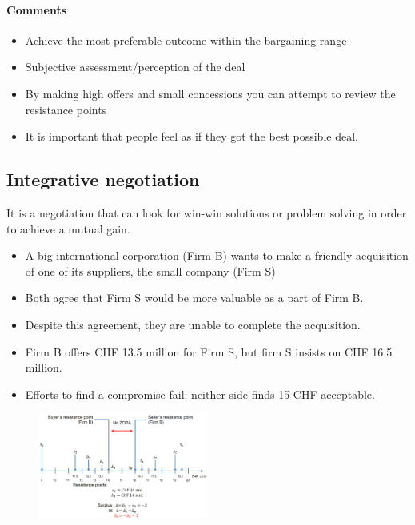 \paragraph{Comments}
\begin{itemize}
    \item Achieve the most preferable outcome within the bargaining range
    \item Subjective assessment/perception of the deal
    \item By making high offers and small concessions you can attempt to review the
        resistance points
    \item It is important that people feel as if they got the best possible deal.
\end{itemize}

\subsection{Integrative negotiation}

It is a negotiation that can look for win-win solutions or problem solving
in order to achieve a mutual gain.

\begin{example}
    \begin{itemize}
        \item A big international corporation (Firm B) wants to make a friendly
            acquisition of one of its suppliers, the small company (Firm S)
        \item Both agree that Firm S would be more valuable as a part of Firm B.
        \item Despite this agreement, they are unable to complete the acquisition.
        \item Firm B offers CHF 13.5 million for Firm S, but firm S insists on CHF
            16.5 million.
        \item Efforts to find a compromise fail: neither side finds 15 CHF acceptable.
    \end{itemize}
\end{example}

\begin{figure}[h]
    \centering
    \includegraphics[width=0.5\textwidth]{Pictures/Example_2.png}
\end{figure}

